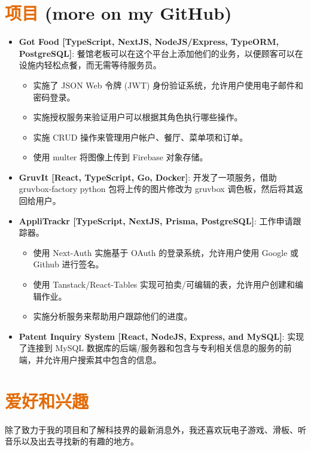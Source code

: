 \documentclass[a4paper, 20pt]{article}
\newcommand{\resumeItem}[2]{
  \item\small{
    \textbf{#1}{: #2 \vspace{-2pt}}
  }
}
\newcommand{\resumeSubItem}[2]{\resumeItem{#1}{#2}\vspace{-3pt}}
\newcommand{\resumeSubHeadingListStart}{\begin{itemize}[leftmargin=*]}
\newcommand{\resumeSubHeadingListEnd}{\end{itemize}}
\begin{document}
\begin{CJK*}{UTF8}{gbsn}
\section{\textcolor[HTML]{E36C09}{\textbf{项目}} \tiny{(more on my GitHub)}}
\resumeSubHeadingListStart{}
      \resumeSubItem{Got Food [TypeScript, NextJS, NodeJS/Express, TypeORM, PostgreSQL]}
      {餐馆老板可以在这个平台上添加他们的业务，以便顾客可以在设施内轻松点餐，而无需等待服务员。}
      \begin{itemize}
        \item{实施了 JSON Web 令牌 (JWT) 身份验证系统，允许用户使用电子邮件和密码登录。}
        \item{实施授权服务来验证用户可以根据其角色执行哪些操作。}
        \item{实施 CRUD 操作来管理用户帐户、餐厅、菜单项和订单。}
        \item{使用 multer 将图像上传到 Firebase 对象存储。}
      \end{itemize}
      \vspace{2pt}
      \resumeSubItem{GruvIt [React, TypeScript, Go, Docker]}
      {开发了一项服务，借助 gruvbox-factory python 包将上传的图片修改为 gruvbox 调色板，然后将其返回给用户。}
      \vspace{2pt}
      \resumeSubItem{AppliTrackr [TypeScript, NextJS, Prisma, PostgreSQL]}
      {工作申请跟踪器。}
      \begin{itemize}
        \item{使用 Next-Auth 实施基于 OAuth 的登录系统，允许用户使用 Google 或 Github 进行签名。}
        \item{使用 Tanstack/React-Tables 实现可拍卖/可编辑的表，允许用户创建和编辑作业。}
        \item{实施分析服务来帮助用户跟踪他们的进度。}
      \end{itemize}
      \vspace{2pt}
      \resumeSubItem{Patent Inquiry System [React, NodeJS, Express, and MySQL]}
      {实现了连接到 MySQL 数据库的后端/服务器和包含与专利相关信息的服务的前端，并允许用户搜索其中包含的信息。}
      \vspace{2pt}
\resumeSubHeadingListEnd{}

\vspace{5pt}
\section{\textcolor[HTML]{E36C09}{\textbf{爱好和兴趣}}}
\par{除了致力于我的项目和了解科技界的最新消息外，我还喜欢玩电子游戏、滑板、听音乐以及出去寻找新的有趣的地方。}


\clearpage\end{CJK*}
\end{document}
